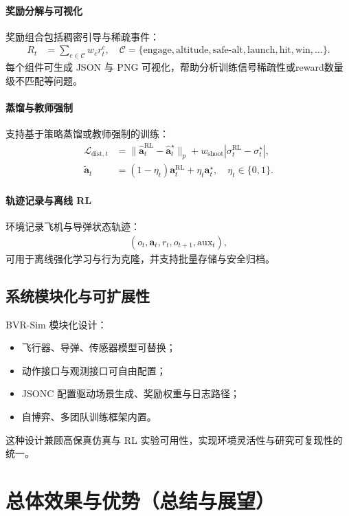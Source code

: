 \documentclass[11pt,a4paper]{article}
\begin{document}
\paragraph{奖励分解与可视化}  
奖励组合包括稠密引导与稀疏事件：
\begin{align}
R_t &= \sum_{c\in\mathcal{C}} w_c r^c_t, \quad
\mathcal{C} = \{\text{engage},\text{altitude},\text{safe-alt},\text{launch},\text{hit},\text{win},\ldots\}.
\end{align}
每个组件可生成 JSON 与 PNG 可视化，帮助分析训练信号稀疏性或reward数量级不匹配等问题。

\paragraph{蒸馏与教师强制}  
支持基于策略蒸馏或教师强制的训练：
\begin{align}
\mathcal{L}_{\text{dist},t} &= \lVert \hat{\mathbf{a}}^{\text{RL}}_t - \hat{\mathbf{a}}^{\star}_t\rVert_p + w_{\text{shoot}}|\sigma^{\text{RL}}_t - \sigma^{\star}_t|, \\
\tilde{\mathbf{a}}_t &= (1-\eta_t)\mathbf{a}^{\text{RL}}_t + \eta_t\mathbf{a}^{\star}_t, \quad \eta_t\in\{0,1\}.
\end{align}

\paragraph{轨迹记录与离线 RL}  
环境记录飞机与导弹状态轨迹：
\begin{align}
(o_t, \mathbf{a}_t, r_t, o_{t+1}, \text{aux}_t),
\end{align}
可用于离线强化学习与行为克隆，并支持批量存储与安全归档。

\subsection{系统模块化与可扩展性}
BVR-Sim 模块化设计：
\begin{itemize}
    \item 飞行器、导弹、传感器模型可替换；
    \item 动作接口与观测接口可自由配置；
    \item JSONC 配置驱动场景生成、奖励权重与日志路径；
    \item 自博弈、多团队训练框架内置。
\end{itemize}
这种设计兼顾高保真仿真与 RL 实验可用性，实现环境灵活性与研究可复现性的统一。

\section{总体效果与优势（总结与展望）}
\end{document}
